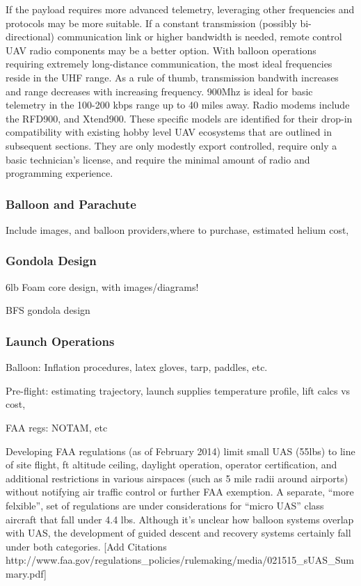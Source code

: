 \documentclass[heading.tex]{subfiles}
\begin{document}
If the payload requires more advanced telemetry, leveraging other frequencies
and protocols may be more suitable. If a constant transmission
(possibly bi-directional) communication link or higher bandwidth is needed,
remote control UAV radio components may be a better option. With balloon
operations requiring extremely long-distance communication, the most ideal
frequencies reside in the UHF range. As a rule of thumb, transmission bandwith
increases and range decreases with increasing frequency. 900Mhz is ideal for
basic telemetry in the 100-200 kbps range up to 40 miles away. Radio modems
include the RFD900, and Xtend900. These specific models are identified for their
drop-in compatibility with existing hobby level UAV ecosystems that are outlined
in subsequent sections. They are only modestly export controlled, require only
a basic technician's license, and require the minimal amount of radio and 
programming experience.

\subsubsection{Balloon and Parachute}

Include images, and balloon providers,where to purchase, estimated helium cost,

\subsubsection{Gondola Design}

\<6lb Foam core design, with images/diagrams!

BFS gondola design

\subsubsection{Launch Operations}

Balloon: Inflation procedures, latex gloves, tarp, paddles, etc.

Pre-flight: estimating trajectory, launch supplies
temperature profile, lift calcs vs cost, 

FAA regs: NOTAM, etc

Developing FAA regulations (as of February 2014) limit small UAS (\<55lbs) to
line of site flight,  ft altitude ceiling, daylight operation, operator certification,
and additional restrictions in various airspaces (such as 5 mile radii around airports)
without notifying air traffic control or further FAA exemption.
A separate, ``more felxible'', set of regulations are under considerations
for ``micro UAS'' class aircraft that fall under 4.4 lbs.
Although it's unclear how balloon systems overlap with UAS, the development
of guided descent and recovery systems certainly fall under both categories.
[Add Citations http://www.faa.gov/regulations_policies/rulemaking/media/021515_sUAS_Summary.pdf]
\end{document}
